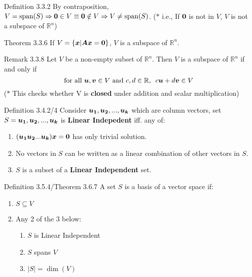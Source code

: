 \documentclass[10pt,portrait]{article}
\begin{document}
\begin{multicols}{2}
\begin{justifying}
\begin{namedthm*}{Definition 3.3.2}
     \medskip
     \noindent
     By contraposition, \(V = \operatorname{span}(S) \Rightarrow \bm{0} \in V \equiv \bm{0} \notin V \Rightarrow V \ne \operatorname{span}(S)\). (\(\ast\) i.e., If \(\bm{0}\) is not in \(V\), \(V\) is not a subspace of \(\mathbb{R}^n\))
\end{namedthm*}

\begin{namedthm*}{Theorem 3.3.6}
	If \(V = \{\bm{x} | \bm{Ax} = \bm{0}\}\), \(V\) is a subspace of \(\mathbb{R}^n\).
\end{namedthm*}

\begin{namedthm*}{Remark 3.3.8}
    Let \(V\) be a non-empty subset of \(\mathbb{R}^n\). Then \(V\) is a subspace of \(\mathbb{R}^n\) if and only if 
    \[
        \text{for all } \bm{u}, \bm{v} \in V \text{ and } c, d\in \mathbb{R},\enspace c\bm{u} + d\bm{v} \in V
    \]
    (\(\ast\) This checks whether V is \textbf{closed} under addition and scalar multiplication)
\end{namedthm*}

\begin{namedthm*}{Definition 3.4.2/4}
	Consider \(\bm{u_1}, \bm{u_2}, ..., \bm{u_k}\) which are column vectors, set \(S = {\bm{u_1}, \bm{u_2}, ..., \bm{u_k}}\) is \textbf{Linear Indepedent} iff. any of:
	\begin{enumerate}
		\item \((\bm{u_1} \bm{u_2} ... \bm{u_k})\bm{x} = \bm{0}\) has only trivial solution.
		\item No vectors in \(S\) can be written as a linear combination of other vectors in \(S\).
		\item \(S\) is a subset of a \textbf{Linear Independent} set.
	\end{enumerate}
\end{namedthm*} 

\begin{namedthm*}{Definition 3.5.4/Theorem 3.6.7}
	A set \(S\) is a basis of a vector space if:
	\begin{enumerate}[label*=\arabic*.]
		\item \(S \subseteq V\)
		\item Any 2 of the 3 below:
		\begin{enumerate}[label*=\arabic*.]
			\item \(S\) is Linear Independent
			\item \(S\) spans \(V\)
			\item \(|S| = \dim(V)\)
		\end{enumerate}
	\end{enumerate}
\end{namedthm*}


\end{justifying}
\end{multicols}
\end{document}

